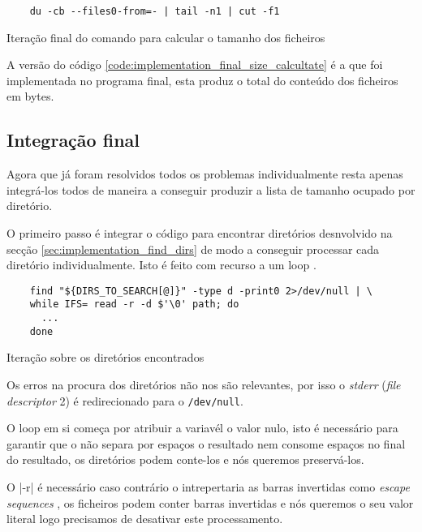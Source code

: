 \begin{listing}[H]
	\centering
	\begin{verbatim}
    du -cb --files0-from=- | tail -n1 | cut -f1
  \end{verbatim}
	\caption{Iteração final do comando para calcular o tamanho dos ficheiros}
	\label{code:implementation_final_size_calcultate}
\end{listing}

A versão do código \ref{code:implementation_final_size_calcultate} é a que foi
implementada no programa final, esta produz o total do conteúdo dos ficheiros em
bytes.

\subsection{Integração final}

Agora que já foram resolvidos todos os problemas individualmente resta apenas
integrá-los todos de maneira a conseguir produzir a lista de tamanho ocupado por
diretório.

O primeiro passo é integrar o código para encontrar diretórios desnvolvido na
secção \ref{sec:implementation_find_dirs} de modo a conseguir processar cada
diretório individualmente. Isto é feito com recurso a um loop
.

\begin{listing}[H]
	\centering
	\begin{verbatim}
    find "${DIRS_TO_SEARCH[@]}" -type d -print0 2>/dev/null | \
    while IFS= read -r -d $'\0' path; do
      ...
    done
  \end{verbatim}
	\caption{Iteração sobre os diretórios encontrados}
\end{listing}

Os erros na procura dos diretórios não nos são relevantes, por isso o
\emph{stderr} (\emph{file descriptor} 2) é redirecionado para o
\Verb|/dev/null|.

O loop em si começa por atribuir a variavél  o valor nulo, isto
é necessário para garantir que o \bashinline{read} não separa por espaços o
resultado nem consome espaços no final do resultado, os diretórios podem
conte-los e nós queremos preservá-los.

O \bashinline|-r| é necessário caso contrário o  intrepertaria
as barras invertidas como \emph{escape sequences} \cite[3191-3193]{posix}, os
ficheiros podem conter barras invertidas e nós queremos o seu valor literal logo
precisamos de desativar este processamento.

